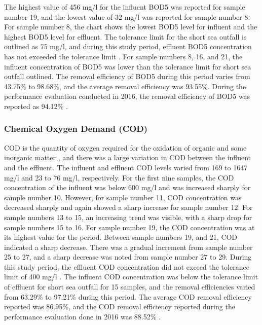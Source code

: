 The highest value of 456 mg/l for the influent \ac{BOD5} was reported for sample number 19, and the lowest value of 32 mg/l was reported for sample number 8. For sample number 8, the chart shows the lowest \ac{BOD5} level for influent and the highest \ac{BOD5} level for effluent. The tolerance limit for the short sea outfall is outlined as 75 mg/l, and during this study period, effluent \ac{BOD5} concentration has not exceeded the tolerance limit \cite{CEA2022}. For sample numbers 8, 16, and 21, the influent concentration of \ac{BOD5} was lower than the tolerance limit for short sea outfall outlined. The removal efficiency of \ac{BOD5} during this period varies from 43.75\% to 98.68\%, and the average removal efficiency was 93.55\%. During the performance evaluation conducted in 2016, the removal efficiency of \ac{BOD5} was reported as 94.12\% \cite{Danushika2016}.




\subsubsection{Chemical Oxygen Demand (COD)}
\ac{COD} is the quantity of oxygen required for the oxidation of organic and some inorganic matter \cite{Prasad2020}, and there was a large variation in \ac{COD} between the influent and the effluent. The influent and effluent \ac{COD} levels varied from 169 to 1647 mg/l and 23 to 76 mg/l, respectively. For the first nine samples, the \ac{COD} concentration of the influent was below 600 mg/l and was increased sharply for sample number 10. However, for sample number 11, \ac{COD} concentration was decreased sharply and again showed a sharp increase for sample number 12. For sample numbers 13 to 15, an increasing trend was visible, with a sharp drop for sample numbers 15 to 16. For sample number 19, the \ac{COD} concentration was at its highest value for the period. Between sample numbers 19, and 21, \ac{COD} indicated a sharp decrease. There was a gradual increment from sample number 25 to 27, and a sharp decrease was noted from sample number 27 to 29. During this study period, the effluent \ac{COD} concentration did not exceed the tolerance limit of 400 mg/l \cite{CEA2022}. The influent \ac{COD} concentration was below the tolerance limit of effluent for short sea outfall for 15 samples, and the removal efficiencies varied from 63.29\% to 97.21\% during this period. The average \ac{COD} removal efficiency reported was 86.95\%, and the \ac{COD} removal efficiency reported during the performance evaluation done in 2016 was 88.52\% \cite{Danushika2016}.

